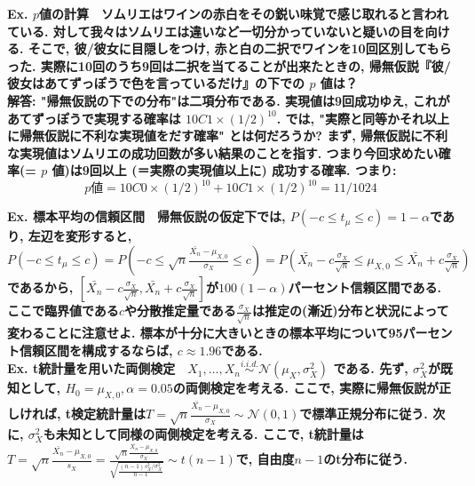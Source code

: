 \documentclass[paper=a4paper,fontsize=10pt]{jlreq}
\begin{document}
\rmfamily\mcfamily\bfseries{Ex. $p$値の計算}\mdseries　ソムリエはワインの赤白をその鋭い味覚で感じ取れると言われている. 対して我々はソムリエは違いなど一切分かっていないと疑いの目を向ける. そこで, 彼/彼女に目隠しをつけ, 赤と白の二択でワインを10回区別してもらった. 実際に10回のうち9回は二択を当てることが出来たときの, 帰無仮説『彼/彼女はあてずっぽうで色を言っているだけ』の下での $p$ 値は？\\\rmfamily\mcfamily\bfseries{解答}\mdseries : "帰無仮説の下での分布"は二項分布である. 実現値は9回成功ゆえ, これがあてずっぽうで実現する確率は $10 C 1 \times (1/2)^{10}$. では, "実際と同等かそれ以上に帰無仮説に不利な実現値をだす確率" とは何だろうか? まず, 帰無仮説に不利な実現値はソムリエの成功回数が多い結果のことを指す. つまり今回求めたい確率(= $p$ 値)は9回以上 (＝実際の実現値以上に) 成功する確率. つまり:
\begin{equation*}
  p値 = 10 C 0 \times (1/2)^{10} + 10 C 1 \times (1/2)^{10} = 11/1024
\end{equation*}

\rmfamily\mcfamily\bfseries{Ex. 標本平均の信頼区間}\mdseries　帰無仮説の仮定下では, $P(-c\leq t_\mu\leq c)=1-\alpha$であり, 左辺を変形すると, $P(-c\leq t_\mu\leq c)=P(-c\leq \sqrt{n} \frac{\bar{X_n}-\mu_{X,0}}{\sigma_X} \leq c)=P(\bar{X_n} - c\frac{\sigma_X}{\sqrt{n}} \leq \mu_{X,0} \leq \bar{X_n} + c\frac{\sigma_X}{\sqrt{n}})$であるから, $[\bar{X_n} - c\frac{\sigma_X}{\sqrt{n}}, \bar{X_n} + c\frac{\sigma_X}{\sqrt{n}}]$が$100(1-\alpha)$パーセント信頼区間である. ここで臨界値である$c$や分散推定量である$\frac{\sigma_X}{\sqrt{n}}$は推定の(漸近)分布と状況によって変わることに注意せよ. 標本が十分に大きいときの標本平均について95パーセント信頼区間を構成するならば, $c \approx 1.96$である.\\

\rmfamily\mcfamily\bfseries{Ex. t統計量を用いた両側検定}\mdseries　$X_1, \dots, X_n \overset{i.i.d.}{\sim}\mathcal{N}(\mu_X, \sigma_X^2) $ である. 先ず, $\sigma_X^2$が既知として, $H_0=\mu_{X,0}, \alpha=0.05$の両側検定を考える. ここで, \rmfamily\mcfamily\bfseries{実際に帰無仮説が正しければ}\mdseries , t検定統計量は$T=\sqrt{n} \frac{\bar{X_n}-\mu_{X,0}}{\sigma_X} \sim \mathcal{N}(0, 1)$で標準正規分布に従う. 次に, $\sigma_X^2$も未知として同様の両側検定を考える. ここで, t統計量は$T=\sqrt{n} \frac{\bar{X_n}-\mu_{X,0}}{s_X} = \frac{\sqrt{n} \frac{\bar{X_n}-\mu_{X,0}}{\sigma_X}}{\sqrt{\frac{(n-1)s_X^2 / \sigma_X^2}{n-1}}} \sim t(n-1)$で, 自由度$n-1$のt分布に従う.\\
\end{document}
